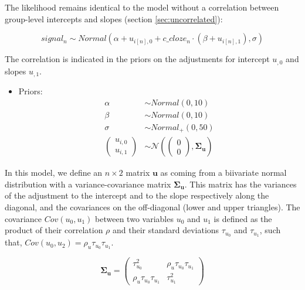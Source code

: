 \documentclass[12pt,]{krantz}
\providecommand{\tightlist}{%
  \setlength{\itemsep}{0pt}\setlength{\parskip}{0pt}}
\theoremstyle{definition}
\theoremstyle{definition}
\theoremstyle{definition}
\theoremstyle{remark}
\begin{document}
The likelihood remains identical to the model without a correlation between group-level intercepts and slopes (section \ref{sec:uncorrelated}):

\begin{equation}
  signal_n \sim Normal(\alpha + u_{i[n],0} + c\_cloze_n \cdot  (\beta + u_{i[n],1}),\sigma)
  \end{equation}

The correlation is indicated in the priors on the adjustments for intercept \(u_{,0}\) and slopes \(u_{,1}\).

\begin{itemize}
\tightlist
\item
  Priors:
  \begin{equation}
   \begin{aligned}
   \alpha & \sim Normal(0,10) \\
   \beta  & \sim Normal(0,10) \\
    \sigma  &\sim Normal_+(0,50)\\
    {\begin{pmatrix}
    u_{i,0} \\
    u_{i,1}
    \end{pmatrix}}
   &\sim {\mathcal {N}}
    \left(
   {\begin{pmatrix} 
    0\\
    0
   \end{pmatrix}}
   ,\boldsymbol{\Sigma_u} \right)
   \end{aligned}
   \end{equation}
\end{itemize}

In this model, we define an \(n\times 2\) matrix \(\mathbf{u}\) as coming from a biivariate normal distribution with a variance-covariance matrix \(\boldsymbol{\Sigma_u}\). This matrix has the variances of the adjustment to the intercept and to the slope respectively along the diagonal, and the covariances on the off-diagonal (lower and upper triangles). The covariance \(Cov(u_0,u_1)\) between two variables \(u_0\) and \(u_1\) is defined as the product of their correlation \(\rho\) and their standard deviations \(\tau_{u_0}\) and \(\tau_{u_1}\), such that, \(Cov(u_0,u_2) = \rho_u \tau_{u_0} \tau_{u_1}\).

\begin{equation}
\boldsymbol{\Sigma_u} = 
{\begin{pmatrix} 
\tau_{u_0}^2 & \rho_u \tau_{u_0} \tau_{u_1} \\ 
\rho_u \tau_{u_0} \tau_{u_1} & \tau_{u_1}^2
\end{pmatrix}}
\end{equation}
\end{document}
